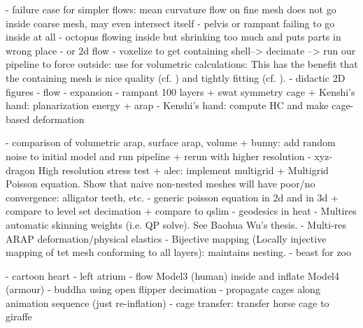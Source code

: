 - failure case for simpler flows: mean curvature flow on fine mesh does not
  go inside coarse mesh, may even intersect itself
    - pelvis or rampant failing to go inside at all
    - octopus flowing inside but shrinking too much and puts parts in wrong
      place
    - or 2d flow
- voxelize to get containing shell--> decimate --> run our pipeline to force
  outside: use for volumetric calculations: This has the benefit that the
  containing mesh is nice quality (cf. \cite{Jacobson:WN:2013}) and tightly
  fitting (cf. \cite{Xu:2014:SDF}).
- didactic 2D figures
  - flow
  - expansion
- rampant 100 layers
+ swat symmetry cage
+ Kenshi's hand: planarization energy + arap
- Kenshi's hand: compute HC and make cage-based deformation

- comparison of volumetric arap, surface arap, volume
+ bunny: add random noise to initial model and run pipeline
  + rerun with higher resolution
- xyz-dragon High resolution stress test
+ alec: implement multigrid
  + Multigrid Poisson equation. Show that naive non-nested meshes will have
    poor/no convergence: alligator teeth, etc.
      - generic poisson equation in 2d and in 3d
        + compare to level set decimation
        + compare to qslim
      - geodesics in heat 
  - Multires automatic skinning weights (i.e. QP solve). See Baohua Wu's thesis.
  - Multi-res ARAP deformation/physical elastics
  - Bijective mapping (Locally injective mapping of tet mesh conforming to all
    layers): maintains nesting.
- beast for zoo

- cartoon heart
- left atrium
- flow Model3 (human) inside and inflate Model4 (armour)
- buddha using open flipper decimation
- propagate cages along animation sequence (just re-inflation)
- cage transfer: transfer horse cage to giraffe

